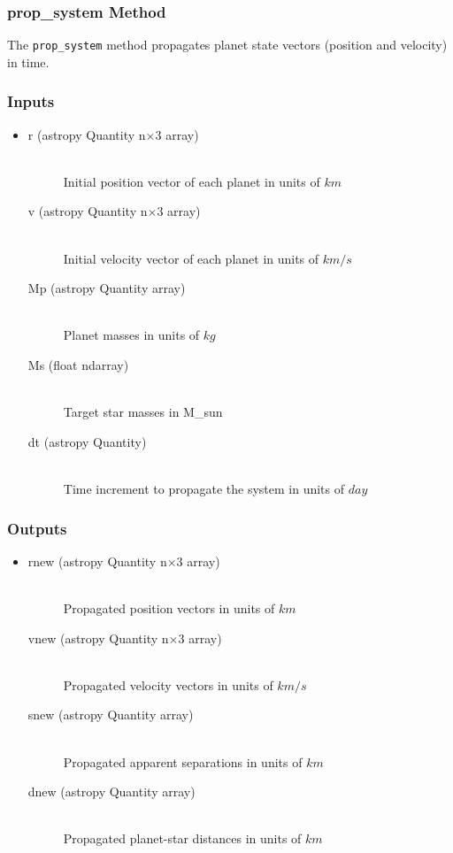 \documentclass[cleanfoot]{asme2ej}
\begin{document}
\subsubsection{prop\_system Method} \label{sec:propsystemtask}
The \verb+prop_system+ method propagates planet state vectors (position and velocity) in time.

\subsubsection*{Inputs}
\begin{itemize}
    \item 
    \begin{description}
        \item[r (astropy Quantity n$\times$3 array)] \hfill \\ Initial position vector of each planet in units of $ km $
        \item[v (astropy Quantity n$\times$3 array)] \hfill \\ Initial velocity vector of each planet in units of $ km/s $
        \item[Mp (astropy Quantity array)] \hfill \\ Planet masses in units of $ kg $
        \item[Ms (float ndarray)] \hfill \\ Target star masses in M\_sun
        \item[dt (astropy Quantity)] \hfill \\ Time increment to propagate the system in units of $ day $
    \end{description}
\end{itemize}
\subsubsection*{Outputs}
\begin{itemize}
    \item 
    \begin{description}
       \item[rnew (astropy Quantity n$\times$3 array)] \hfill \\ Propagated position vectors in units of $ km $
       \item[vnew (astropy Quantity n$\times$3 array)] \hfill \\ Propagated velocity vectors in units of $ km/s $
       \item[snew (astropy Quantity array)] \hfill \\ Propagated apparent separations in units of $ km $
       \item[dnew (astropy Quantity array)] \hfill \\ Propagated planet-star distances in units of $ km $
    \end{description}
\end{itemize}
\end{document}
